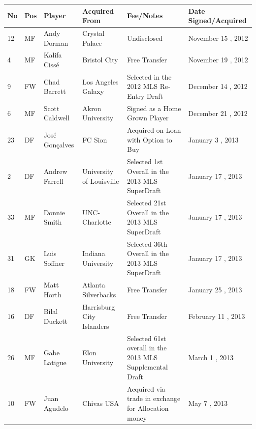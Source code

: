 \documentclass{article}
\begin{document}
\begin{tabular}{llllll}
\toprule
No & Pos & Player & Acquired From & Fee/Notes & Date Signed/Acquired \\
\midrule
12 & MF & Andy Dorman & Crystal Palace & Undisclosed & November 15 , 2012 \\
4 & MF & Kalifa Cissé & Bristol City & Free Transfer & November 19 , 2012 \\
9 & FW & Chad Barrett & Los Angeles Galaxy & Selected in the 2012 MLS Re-Entry Draft & December 14 , 2012 \\
6 & MF & Scott Caldwell & Akron University & Signed as a Home Grown Player & December 21 , 2012 \\
23 & DF & José Gonçalves & FC Sion & Acquired on Loan with Option to Buy & January 3 , 2013 \\
2 & DF & Andrew Farrell & University of Louisville & Selected 1st Overall in the 2013 MLS SuperDraft & January 17 , 2013 \\
33 & MF & Donnie Smith & UNC-Charlotte & Selected 21st Overall in the 2013 MLS SuperDraft & January 17 , 2013 \\
31 & GK & Luis Soffner & Indiana University & Selected 36th Overall in the 2013 MLS SuperDraft & January 17 , 2013 \\
18 & FW & Matt Horth & Atlanta Silverbacks & Free Transfer & January 25 , 2013 \\
16 & DF & Bilal Duckett & Harrisburg City Islanders & Free Transfer & February 11 , 2013 \\
26 & MF & Gabe Latigue & Elon University & Selected 61st overall in the 2013 MLS Supplemental Draft & March 1 , 2013 \\
10 & FW & Juan Agudelo & Chivas USA & Acquired via trade in exchange for Allocation money & May 7 , 2013 \\
\bottomrule
\end{tabular}
\end{document}
